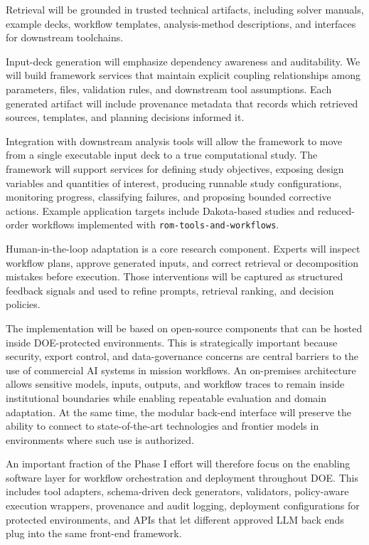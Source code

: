 \documentclass[11pt]{article} \usepackage[margin=1in]{geometry}
\begin{document}
Retrieval will be grounded in trusted technical artifacts, including solver
manuals, example decks, workflow templates, analysis-method descriptions, and
interfaces for downstream toolchains.

Input-deck generation will emphasize dependency awareness and auditability. We
will build framework services that maintain explicit coupling relationships
among parameters, files, validation rules, and downstream tool assumptions. Each
generated artifact will include provenance metadata that records which retrieved
sources, templates, and planning decisions informed it.

Integration with downstream analysis tools will allow the framework to move from
a single executable input deck to a true computational study. The framework will
support services for defining study objectives, exposing design variables and
quantities of interest, producing runnable study configurations, monitoring
progress, classifying failures, and proposing bounded corrective actions.
Example application targets include Dakota-based studies and reduced-order
workflows implemented with \texttt{rom-tools-and-workflows}.

Human-in-the-loop adaptation is a core research component. Experts will inspect
workflow plans, approve generated inputs, and correct retrieval or decomposition
mistakes before execution. Those interventions will be captured as structured
feedback signals and used to refine prompts, retrieval ranking, and decision
policies.

The implementation will be based on open-source components that can be hosted
inside DOE-protected environments. This is strategically important because
security, export control, and data-governance concerns are central barriers to
the use of commercial AI systems in mission workflows. An on-premises
architecture allows sensitive models, inputs, outputs, and workflow traces to
remain inside institutional boundaries while enabling repeatable evaluation and
domain adaptation. At the same time, the modular back-end interface will
preserve the ability to connect to state-of-the-art technologies and frontier
models in environments where such use is authorized.

An important fraction of the Phase I effort will therefore focus on the enabling
software layer for workflow orchestration and deployment throughout DOE. This
includes tool adapters, schema-driven deck generators, validators, policy-aware
execution wrappers, provenance and audit logging, deployment configurations for
protected environments, and APIs that let different approved LLM back ends plug
into the same front-end framework.
\end{document}
